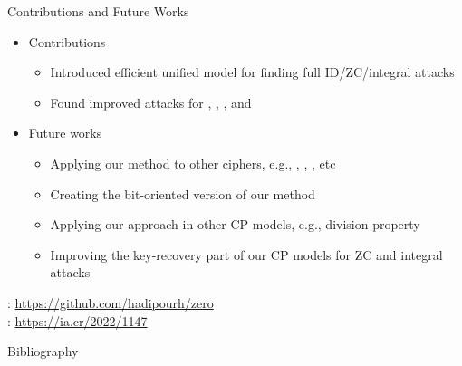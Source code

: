 \documentclass[table,aspectratio=169]{beamer}
\begin{document}
\begin{frame}{Contributions and Future Works}
\vspace{-0.5cm}
\begin{itemize}
\item Contributions
\begin{itemize}
\small
\item[\textcolor{tugblue}{\faChevronCircleRight}] Introduced efficient unified model for finding full ID/ZC/integral attacks
\item[\textcolor{tugblue}{\faChevronCircleRight}] Found improved attacks for , , , and 
\end{itemize}
\item Future works
\begin{itemize}
\small
\item[\faRoad] Applying our method to other ciphers, e.g., , , , etc
\item[\faRoad] Creating the bit-oriented version of our method
\item[\faRoad] Applying our approach in other CP models, e.g., division property
\item[\faRoad] Improving the key-recovery part of our CP models for ZC and integral attacks
\end{itemize} 
\end{itemize}
\begin{center}
\vspace{0.12cm}


\faGithub: \url{https://github.com/hadipourh/zero}\\
\vspace{0.1cm}
\faArchive: \url{https://ia.cr/2022/1147}
\end{center}
\end{frame}


















\begin{frame}[allowframebreaks]{Bibliography}
  \printbibliography
\end{frame}
\end{document}

